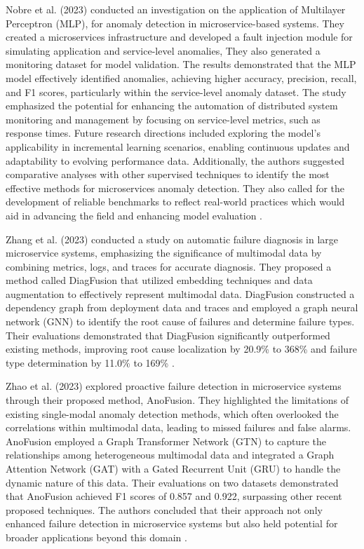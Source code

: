 \documentclass[10pt,journal,compsoc]{IEEEtran}
\begin{document}
Nobre et al. (2023) conducted an investigation on the application of Multilayer Perceptron (MLP), for anomaly detection in microservice-based systems. They created a microservices infrastructure and developed a fault injection module for simulating application and service-level anomalies, They also generated  a monitoring dataset for model validation. The results demonstrated that the MLP model effectively identified anomalies, achieving higher accuracy, precision, recall, and F1 scores, particularly within the service-level anomaly dataset. The study emphasized the potential for enhancing the automation of distributed system monitoring and management by focusing on service-level metrics, such as response times. Future research directions included exploring the model's applicability in incremental learning scenarios, enabling continuous updates and adaptability to evolving performance data. Additionally, the authors suggested comparative analyses with other supervised techniques to identify the most effective methods for microservices anomaly detection. They also called for the development of reliable benchmarks to reflect real-world practices which would aid in advancing the field and enhancing model evaluation \cite{nobre2023anomaly}.

Zhang et al. (2023) conducted a study on automatic failure diagnosis in large microservice systems, emphasizing the significance of multimodal data by combining metrics, logs, and traces for accurate diagnosis. They proposed a method called DiagFusion that utilized embedding techniques and data augmentation to effectively represent multimodal data. DiagFusion constructed a dependency graph from deployment data and traces and employed a graph neural network (GNN) to identify the root cause of failures and determine failure types. Their evaluations demonstrated that DiagFusion significantly outperformed existing methods, improving root cause localization by 20.9\% to 368\% and failure type determination by 11.0\% to 169\% \cite{zhang2023robust}.

Zhao et al. (2023) explored proactive failure detection in microservice systems through their proposed method, AnoFusion. They highlighted the limitations of existing single-modal anomaly detection methods, which often overlooked the correlations within multimodal data, leading to missed failures and false alarms. AnoFusion employed a Graph Transformer Network (GTN) to capture the relationships among heterogeneous multimodal data and integrated a Graph Attention Network (GAT) with a Gated Recurrent Unit (GRU) to handle the dynamic nature of this data. Their evaluations on two datasets demonstrated that AnoFusion achieved F1 scores of 0.857 and 0.922, surpassing other recent proposed techniques. The authors concluded that their approach not only enhanced failure detection in microservice systems but also held potential for broader applications beyond this domain \cite{zhao2023robust}.
\end{document}
